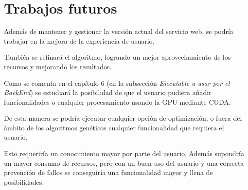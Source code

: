 	

\section{Trabajos futuros}

\bigskip
Además de mantener y gestionar la versión actual del servicio web, se podría trabajar en la mejora de la experiencia de usuario.

\bigskip
También se refinará el algoritmo, logrando un mejor aprovechamiento de los recursos y mejorando los resultados.

\bigskip
Como se comenta en el capítulo 6 (en la subsección \textit{Ejecutable a usar por el BackEnd}) se estudiará la posibilidad de que el usuario pudiera añadir funcionalidades o cualquier procesamiento usando la GPU mediante CUDA. 

\bigskip
De esta manera se podría ejecutar cualquier opción de optimización, o fuera del ámbito de los algoritmos genéticos cualquier funcionalidad que requiera el usuario.

\bigskip
Esto requeriría un conocimiento mayor por parte del usuario. Además supondría un mayor consumo de recursos, pero con un buen uso del usuario y una correcta prevención de fallos se conseguiría una funcionalidad mayor y llena de posibilidades. 








